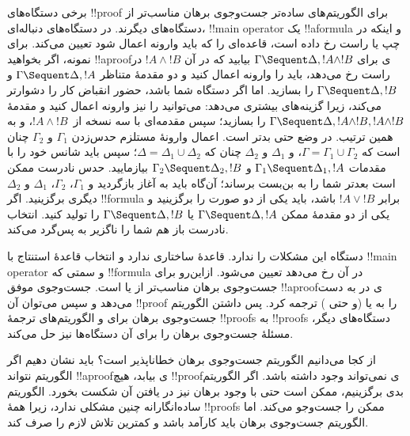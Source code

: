 \documentclass[../../../include/open-logic-section]{subfiles}
\begin{document}
برخی دستگاه‌های !!{proof} برای الگوریتم‌های ساده‌تر جست‌وجوی برهان
مناسب‌تر از دستگاه‌های دیگرند. در دستگاه‌های دنباله‌ای،
!!{main operator} یک !!a{formula} و اینکه در چپ یا راست رخ داده است،
قاعده‌ای را که باید وارونه اعمال شود تعیین می‌کند. برای نمونه، اگر
بخواهید !!a{proof}ی برای
$\Gamma \Sequent \Delta, !A \land !B$ بیابید که در آن
$!A \land !B$ در راست رخ می‌دهد، باید \RightR{\land} را وارونه اعمال
کنید و دو مقدمهٔ متناظر
$\Gamma \Sequent \Delta, !A$ و
$\Gamma \Sequent \Delta, !B$ را بسازید. اما اگر دستگاه شما
 باشد، حضور انقباض کار را دشوارتر می‌کند، زیرا گزینه‌های
بیشتری می‌دهد: می‌توانید \RightR{\Contraction} را نیز وارونه اعمال
کنید و مقدمهٔ
$\Gamma \Sequent \Delta, !A \land !B, !A \land !B$ را بسازید؛ سپس
مقدمه‌ای با سه نسخه از~$!A \land !B$، و به همین ترتیب. در 
وضع حتی بدتر است. اعمال وارونهٔ \RightR{\land} مستلزم حدس‌زدن
$\Gamma_1$ و $\Gamma_2$ چنان است که
$\Gamma = \Gamma_1 \cup \Gamma_2$، و $\Delta_1$ و $\Delta_2$ چنان که
$\Delta = \Delta_1 \cup \Delta_2$؛ سپس باید شانس خود را با مقدمات
$\Gamma_1 \Sequent \Delta_1, !A$ و
$\Gamma_2 \Sequent \Delta_2, !B$ بیازمایید. حدس نادرست ممکن است
بعدتر شما را به بن‌بست برساند؛ آن‌گاه باید به آغاز بازگردید و
$\Gamma_1$، $\Gamma_2$، $\Delta_1$ و $\Delta_2$ دیگری برگزینید. اگر
!!{formula} برابر $!A \lor !B$ باشد، باید یکی از دو صورت
\RightR{\lor} را برگزینید و یکی از دو مقدمهٔ ممکن
$\Gamma \Sequent \Delta, !A$ یا
$\Gamma \Sequent \Delta, !B$ را تولید کنید. انتخاب نادرست باز هم
شما را ناگزیر به پس‌گرد می‌کند.

دستگاه  این مشکلات را ندارد. قاعدهٔ ساختاری ندارد و انتخاب
قاعدهٔ استنتاج با !!{main operator} و سمتی که !!{formula} در آن رخ
می‌دهد تعیین می‌شود. ازاین‌رو  برای جست‌وجوی برهان مناسب‌تر
از  یا  است. جست‌وجوی موفق !!a{proof}ی در
 به دست می‌دهد و سپس می‌توان آن !!{proof} را به 
یا  (و حتی ) ترجمه کرد. پس داشتن الگوریتم جست‌وجوی
برهان برای  و الگوریتم‌های ترجمهٔ !!{proof}s  به
!!{proof}s دستگاه‌های دیگر، مسئلهٔ جست‌وجوی برهان را برای آن
دستگاه‌ها نیز حل می‌کند.

از کجا می‌دانیم الگوریتم جست‌وجوی برهان خطاناپذیر است؟ باید نشان دهیم
اگر الگوریتم نتواند !!a{proof}ی بیابد، هیچ !!{proof}ی نمی‌تواند وجود
داشته باشد. اگر الگوریتم بدی برگزینیم، ممکن است حتی با وجود برهان نیز
در یافتن آن شکست بخورد. الگوریتم ساده‌انگارانه چنین مشکلی ندارد، زیرا
همهٔ !!{proof}s ممکن را جست‌وجو می‌کند. اما الگوریتم جست‌وجوی برهان
باید کارآمد باشد و کمترین تلاش لازم را صرف کند.
\end{document}
